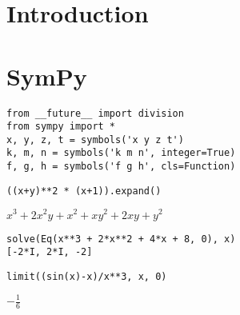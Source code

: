 \documentclass[aps,pra,groupedaddress]{revtex4-1}
\begin{document}
\pacs{}

\maketitle

\section{Introduction}

\section{SymPy}

\begin{verbatim}
from __future__ import division
from sympy import *
x, y, z, t = symbols('x y z t')
k, m, n = symbols('k m n', integer=True)
f, g, h = symbols('f g h', cls=Function)
\end{verbatim}

\begin{verbatim}
((x+y)**2 * (x+1)).expand()
\end{verbatim}

$ x^{3} + 2 x^{2} y + x^{2} + x y^{2} + 2 x y + y^{2} $

\begin{verbatim}
solve(Eq(x**3 + 2*x**2 + 4*x + 8, 0), x)
[-2*I, 2*I, -2]
\end{verbatim}

\begin{verbatim}
limit((sin(x)-x)/x**3, x, 0)
\end{verbatim}

$ - \frac{1}{6} $
\end{document}
